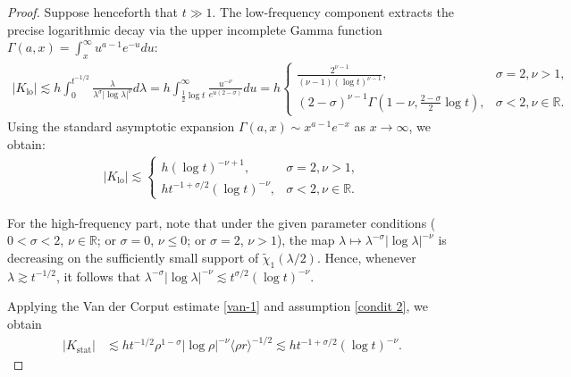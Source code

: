 \documentclass[reqno]{amsart}
\numberwithin{equation}{section}
\begin{document}
\begin{proof}
	Suppose henceforth that $t\gg1$. 
The low-frequency component extracts the precise logarithmic decay via the upper incomplete Gamma function $\Gamma(a, x) = \int_x^\infty u^{a-1} e^{-u} du$:
	\begin{align*}
		|K_{\mathrm{lo}}|
	\lesssim h	\int_0^{t^{-1/2}} \frac{\lambda}{\lambda^{\sigma} |\log \lambda|^{\nu}} d\lambda 
		= h\int_{\frac{1}{2}\log t}^{\infty} \frac{u^{-\nu}}{e^{u(2-\sigma)}} du	
		= h\begin{cases}
			\frac{2^{\nu-1}}{(\nu-1)(\log t)^{\nu-1}}, & \sigma=2, \nu>1, \\[4pt]
			(2-\sigma)^{\nu-1} \Gamma( 1-\nu, \frac{2-\sigma}{2} \log t ), & \sigma<2, \nu \in \mathbb{R}.
		\end{cases}
	\end{align*}
	Using the standard asymptotic expansion $\Gamma(a,x) \sim x^{a-1}e^{-x}$ as $x \to \infty$, we obtain:
	\begin{align}\label{low-fre}
		|K_{\mathrm{lo}}| \lesssim 
		\begin{cases}
			h(\log t)^{-\nu+1},               & \sigma=2, \nu>1,              \\[4pt]
			ht^{-1+\sigma/2} (\log t)^{-\nu}, & \sigma<2, \nu \in \mathbb{R}.
		\end{cases}
	\end{align}
	
	

	
	For the high-frequency part, note that under the given parameter conditions ($0 < \sigma < 2$, $\nu \in \mathbb{R}$; or $\sigma = 0$, $\nu \le 0$; or $\sigma = 2$, $\nu > 1$),
	the map $\lambda \mapsto \lambda^{-\sigma}|\log \lambda|^{-\nu}$ is decreasing  on the sufficiently small support of
	$\widetilde{\chi}_1(\lambda/2)$.  Hence, whenever
	$\lambda\gtrsim t^{-1/2}$, it follows that
	$
	\lambda^{-\sigma}
	|\log\lambda|^{-\nu}
	\lesssim
	t^{\sigma/2}
	(\log t)^{-\nu}.
	$

	
	Applying the Van der Corput estimate  \eqref{van-1} and
	assumption \eqref{condit 2}, we obtain
	\begin{align}\label{Ksat}
		|K_{\mathrm{stat}}|
		&\lesssim
		h t^{-1/2}
		\rho^{1-\sigma}
		|\log\rho|^{-\nu}
		\langle\rho r\rangle^{-1/2}\lesssim
		h t^{-1+\sigma/2}
		(\log t)^{-\nu}.
	\end{align}
	



	
	

\end{proof}
\end{document}

